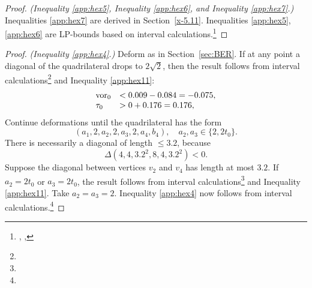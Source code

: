 \begin{proof}
{\it (Inequality \ref{app:hex5}, Inequality \ref{app:hex6}, and
Inequality \ref{app:hex7}.)} Inequalities \ref{app:hex7} are
derived in Section~\ref{x-5.11}. Inequalities \ref{app:hex5},
\ref{app:hex6} are LP-bounds based on interval
calculations.\footnote{, ,
}
\end{proof}

\begin{proof} {\it (Inequality \ref{app:hex4}.)} Deform as in
Section~\ref{sec:BER}. If at any point a diagonal of the
quadrilateral drops to $2\sqrt2$, then the result follows from
interval
calculations\footnote{} %
and Inequality \ref{app:hex11}:
    $$
    \begin{array}{lll}
    \operatorname{vor}_0 &< 0.009 -0.084 = -0.075,\\
    \tau_0 &> 0 + 0.176 = 0.176,\\
    \end{array}
    $$
Continue deformations until the quadrilateral has the form
    $$(a_1,2,a_2,2,a_3,2,a_4,b_4),\quad a_2,a_3\in\{2,2t_0\}.$$
There is necessarily a diagonal of length $\le3.2$, because
    $$\Delta(4,4,3.2^2,8,4,3.2^2)<0.$$
Suppose the diagonal between vertices $v_2$ and $v_4$ has length
at most $3.2$.  If $a_2=2t_0$ or $a_3=2t_0$, the result follows
from interval calculations\footnote{} %
and Inequality \ref{app:hex11}. Take $a_2=a_3=2$. Inequality
\ref{app:hex4} now follows from interval
calculations.\footnote{} %
\end{proof}

